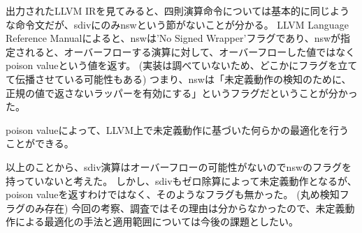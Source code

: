 出力されたLLVM IRを見てみると、四則演算命令については基本的に同じような命令文だが、sdivにのみnswという節がないことが分かる。
LLVM Language Reference Manualによると、nswは'No Signed Wrapper'フラグであり、nswが指定されると、オーバーフローする演算に対して、オーバーフローした値ではなくpoison valueという値を返す。
(実装は調べていないため、どこかにフラグを立てて伝播させている可能性もある)
つまり、nswは「未定義動作の検知のために、正規の値で返さないラッパーを有効にする」というフラグだということが分かった。

poison valueによって、LLVM上で未定義動作に基づいた何らかの最適化を行うことができる。

以上のことから、sdiv演算はオーバーフローの可能性がないのでnswのフラグを持っていないと考えた。
しかし、sdivもゼロ除算によって未定義動作となるが、poison valueを返すわけではなく、そのようなフラグも無かった。
(丸め検知フラグのみ存在)
今回の考察、調査ではその理由は分からなかったので、未定義動作による最適化の手法と適用範囲については今後の課題としたい。
